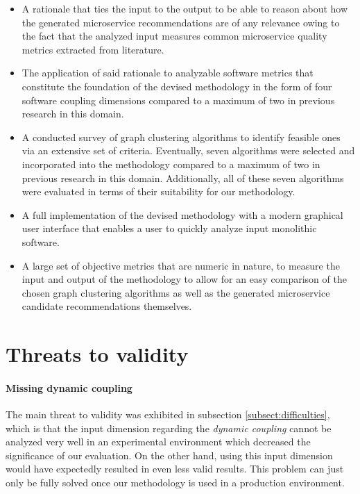 \documentclass[12pt,a4paper]{report}
\begin{document}
\begin{itemize}
    \item A rationale that ties the input to the output to be able to reason
    about how the generated microservice recommendations are of any relevance
    owing to the fact that the analyzed input measures common microservice
    quality metrics extracted from literature.
    \item The application of said rationale to analyzable software metrics
    that constitute the foundation of the devised methodology in the form
    of four software coupling dimensions compared to a maximum
    of two in previous research in this domain.
    \item A conducted survey of graph clustering algorithms to identify feasible
    ones via an extensive set of criteria. Eventually, seven algorithms were
    selected and incorporated into the methodology compared to a maximum
    of two in previous research in this domain. Additionally, all of these seven
    algorithms were evaluated in terms of their suitability for our methodology.
    \item A full implementation of the devised methodology with a modern
    graphical user interface that enables a user to quickly analyze input
    monolithic software.
    \item A large set of objective metrics that are numeric in nature,
    to measure the input and output of the methodology to allow for an
    easy comparison of the chosen graph clustering algorithms as well as
    the generated microservice candidate recommendations themselves.
\end{itemize}



\section{Threats to validity} \label{sect:threats-to-validity}

\paragraph{Missing dynamic coupling} The main threat to validity was exhibited
in subsection \ref{subsect:difficulties}, which is that the input dimension
regarding the \textit{dynamic coupling} cannot be analyzed very well in an
experimental environment which decreased the significance of our evaluation. On
the other hand, using this input dimension would have expectedly resulted in
even less valid results. This problem can just only be fully solved once our
methodology is used in a production environment.
\end{document}
